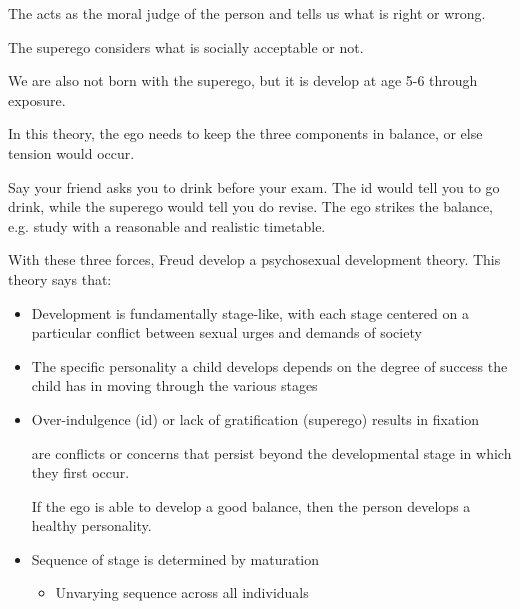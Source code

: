 \documentclass[../main/main.tex]{subfiles}
\begin{document}
\begin{definition}
The  acts as the moral judge of the person and tells us what is right or wrong.
\end{definition}
\begin{example}
The superego considers what is socially acceptable or not.
\end{example}
\begin{remark}
We are also not born with the superego, but it is develop at age 5-6 through exposure.
\end{remark}

In this theory, the ego needs to keep the three components in balance, or else tension would occur.

\begin{example}
Say your friend asks you to drink before your exam. The id would tell you to go drink, while the superego would tell you do revise. The ego strikes the balance, e.g. study with a reasonable and realistic timetable.
\end{example}

With these three forces, Freud develop a psychosexual development theory. This theory says that:
\begin{itemize}
        \item Development is fundamentally stage-like, with each stage centered on a particular conflict between sexual urges and demands of society
\item The specific personality a child develops depends on the degree of success the child has in moving through the various stages
\item Over-indulgence (id) or lack of gratification (superego) results in fixation
        \begin{definition}
           are conflicts or concerns that persist beyond the developmental stage in which they first occur.
        \end{definition}
        \begin{remark}
If the ego is able to develop a good balance, then the person develops a healthy personality.
        \end{remark}
  \item Sequence of stage is determined by maturation
        \begin{itemize}
        \item Unvarying sequence across all individuals
        \end{itemize}
\end{itemize}
\end{document}
